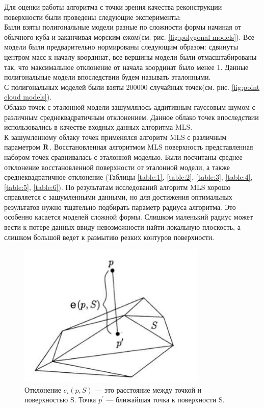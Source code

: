 Для оценки работы алгоритма с точки зрения качества реконструкции поверхности были проведены следующие эксперименты:\\ 
Были взяты полигональные модели разные по сложности формы начиная от обычного куба и заканчивая морским ежом(см. рис. \ref{fig:polygonal models}). Все модели были предварительно нормированы следующим образом: сдвинуты центром масс к началу координат, все вершины модели были отмасштабированы так, что максимальное отклонение от начала координат было менее 1. Данные полигональные модели впоследствии будем называть эталонными.\\
С полигональных моделей были взяты 200000 случайных точек(см. рис. \ref{fig:point cloud models}).\\ 
Облако точек с эталонной модели зашумлялось аддитивным гауссовым шумом с различным среднеквадратичным отклонением. Данное облако точек впоследствии использовались в качестве входных данных алгоритма MLS.\\
К зашумленному облаку точек применялся алгоритм MLS с различным параметром $\bold{R}$. Восстановленная алгоритмом MLS поверхность представленная набором точек сравнивалась с эталонной моделью.
Были посчитаны среднее отклонение восстановленной поверхности от эталонной модели, а также среднеквадратичное отклонение (Таблицы \ref{table:1}, \ref{table:2}, \ref{table:3}, \ref{table:4}, \ref{table:5}, \ref{table:6}). По результатам исследований алгоритм MLS хорошо справляется с зашумленными данными, но для достижения оптимальных результатов нужно тщательно подбирать параметр радиуса алгоритма. Это особенно касается моделей сложной формы. Слишком маленький радиус может вести к потере данных ввиду невозможности найти локальную плоскость, а слишком большой ведет к размытию резких контуров поверхности.

\begin{figure}[h]
  \centering
    \includegraphics[width=0.8\textwidth]{images/distance.jpg}
  \caption{Отклонение $e_i(p, S)$ — это расстояние между точкой и поверхностью S. Точка $p^{'}$ — ближайшая точка к поверхности S.}
\end{figure}

